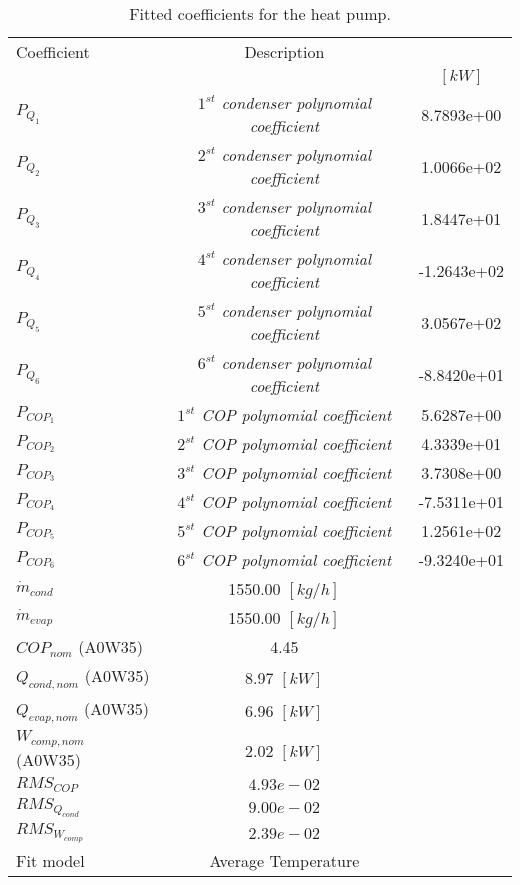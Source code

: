 \documentclass[english]{SPFShortReport}
\author{Dani Carbonell}
\begin{document}
\begin{table}[!ht]
\begin{small}
\caption{Fitted coefficients for the heat pump.}
\begin{center}
\resizebox{12cm}{!} 
{
\begin{tabular}{l | c c } 
\hline
\hline
Coefficient &Description & \\ 
 & &$[kW]$\\ 
\hline
$P_{Q_{1}}$ & \emph{$1^{st}$ condenser polynomial coefficient}  & 8.7893e+00    \\ 
$P_{Q_{2}}$ & \emph{$2^{st}$ condenser polynomial coefficient}  & 1.0066e+02    \\ 
$P_{Q_{3}}$ & \emph{$3^{st}$ condenser polynomial coefficient}  & 1.8447e+01    \\ 
$P_{Q_{4}}$ & \emph{$4^{st}$ condenser polynomial coefficient}  & -1.2643e+02    \\ 
$P_{Q_{5}}$ & \emph{$5^{st}$ condenser polynomial coefficient}  & 3.0567e+02    \\ 
$P_{Q_{6}}$ & \emph{$6^{st}$ condenser polynomial coefficient}  & -8.8420e+01    \\ 
\hline
$P_{COP_{1}}$ & \emph{$1^{st}$ COP polynomial coefficient}  & 5.6287e+00    \\ 
$P_{COP_{2}}$ & \emph{$2^{st}$ COP polynomial coefficient}  & 4.3339e+01    \\ 
$P_{COP_{3}}$ & \emph{$3^{st}$ COP polynomial coefficient}  & 3.7308e+00    \\ 
$P_{COP_{4}}$ & \emph{$4^{st}$ COP polynomial coefficient}  & -7.5311e+01    \\ 
$P_{COP_{5}}$ & \emph{$5^{st}$ COP polynomial coefficient}  & 1.2561e+02    \\ 
$P_{COP_{6}}$ & \emph{$6^{st}$ COP polynomial coefficient}  & -9.3240e+01    \\ 
\hline
$\dot m_{cond}$ & 1550.00 $[kg/h]$ \\ 
$\dot m_{evap}$ & 1550.00 $[kg/h]$ \\ 
\hline
$COP_{nom}$ (A0W35)& 4.45 \\ 
$Q_{cond,nom}$ (A0W35)& 8.97 $[kW]$\\ 
$Q_{evap,nom}$ (A0W35)& 6.96 $[kW]$\\ 
$W_{comp,nom}$ (A0W35)& 2.02 $[kW]$\\ 
\hline
 $RMS_{COP}$ & $4.93e-02$ \\ 
 $RMS_{Q_{cond}}$ & $9.00e-02$ \\ 
 $RMS_{W_{comp}}$ & $2.39e-02$ \\ 
\hline
Fit model & Average Temperature\\ 
\hline
\hline
\end{tabular}
}
\label{CoefTable}
\end{center}
\end{small}
\end{table}
\end{document}
